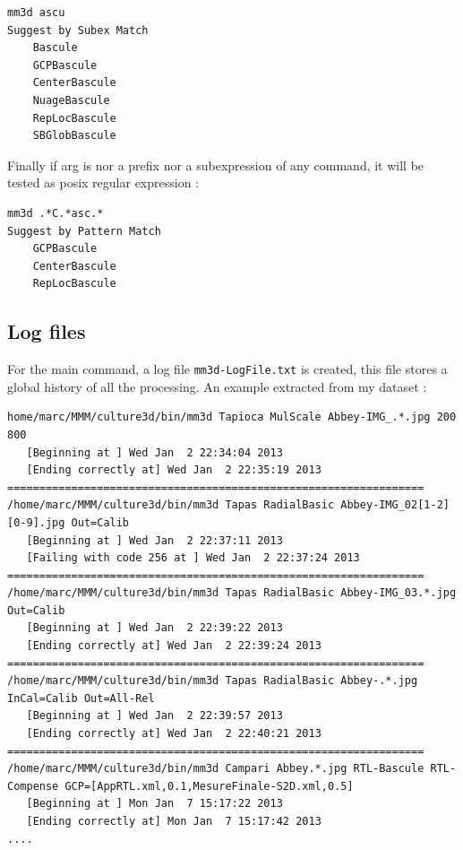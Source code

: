 \begin{verbatim}
mm3d ascu
Suggest by Subex Match
    Bascule
    GCPBascule
    CenterBascule
    NuageBascule
    RepLocBascule
    SBGlobBascule
\end{verbatim}


Finally if arg is nor a prefix nor a subexpression of any command, it will be tested as posix regular
expression :

\begin{verbatim}
mm3d .*C.*asc.*
Suggest by Pattern Match
    GCPBascule
    CenterBascule
    RepLocBascule
\end{verbatim}

\subsection{Log files}

For the main command, a log file {\tt mm3d-LogFile.txt} is created, this file stores
a global history of all the processing. An example extracted from my dataset :

\begin{verbatim}
home/marc/MMM/culture3d/bin/mm3d Tapioca MulScale Abbey-IMG_.*.jpg 200 800
   [Beginning at ] Wed Jan  2 22:34:04 2013
   [Ending correctly at] Wed Jan  2 22:35:19 2013
=================================================================
/home/marc/MMM/culture3d/bin/mm3d Tapas RadialBasic Abbey-IMG_02[1-2][0-9].jpg Out=Calib
   [Beginning at ] Wed Jan  2 22:37:11 2013
   [Failing with code 256 at ] Wed Jan  2 22:37:24 2013
=================================================================
/home/marc/MMM/culture3d/bin/mm3d Tapas RadialBasic Abbey-IMG_03.*.jpg Out=Calib
   [Beginning at ] Wed Jan  2 22:39:22 2013
   [Ending correctly at] Wed Jan  2 22:39:24 2013
=================================================================
/home/marc/MMM/culture3d/bin/mm3d Tapas RadialBasic Abbey-.*.jpg InCal=Calib Out=All-Rel
   [Beginning at ] Wed Jan  2 22:39:57 2013
   [Ending correctly at] Wed Jan  2 22:40:21 2013
=================================================================
/home/marc/MMM/culture3d/bin/mm3d Campari Abbey.*.jpg RTL-Bascule RTL-Compense GCP=[AppRTL.xml,0.1,MesureFinale-S2D.xml,0.5]
   [Beginning at ] Mon Jan  7 15:17:22 2013
   [Ending correctly at] Mon Jan  7 15:17:42 2013
....
\end{verbatim}





